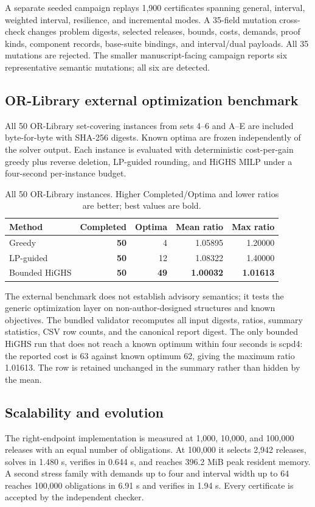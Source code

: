 \documentclass[10pt,conference]{IEEEtran}
\newcommand{\suppTableFont}{\footnotesize}
\begin{document}
A separate seeded campaign replays 1,900 certificates spanning general, interval, weighted interval, resilience, and incremental modes. A 35-field mutation cross-check changes problem digests, selected releases, bounds, costs, demands, proof kinds, component records, base-suite bindings, and interval/dual payloads. All 35 mutations are rejected. The smaller manuscript-facing campaign reports six representative semantic mutations; all six are detected.

\subsection{OR-Library external optimization benchmark}
All 50 OR-Library set-covering instances from sets 4--6 and A--E are included byte-for-byte with SHA-256 digests. Known optima are frozen independently of the solver output. Each instance is evaluated with deterministic cost-per-gain greedy plus reverse deletion, LP-guided rounding, and HiGHS MILP under a four-second per-instance budget.

\begin{table}[t]
\centering
\caption{All 50 OR-Library instances. Higher Completed/Optima and lower ratios are better; best values are bold.}
\suppTableFont
\begin{tabular}{lrrrr}
\toprule
Method & Completed & Optima & Mean ratio & Max ratio \\
\midrule
Greedy & \textbf{50} & 4 & 1.05895 & 1.20000 \\
LP-guided & \textbf{50} & 12 & 1.08322 & 1.40000 \\
Bounded HiGHS & \textbf{50} & \textbf{49} & \textbf{1.00032} & \textbf{1.01613} \\
\bottomrule
\end{tabular}
\end{table}

The external benchmark does not establish advisory semantics; it tests the generic optimization layer on non-author-designed structures and known objectives. The bundled validator recomputes all input digests, ratios, summary statistics, CSV row counts, and the canonical report digest.
The only bounded HiGHS run that does not reach a known optimum within four seconds is scpd4: the reported cost is 63 against known optimum 62, giving the maximum ratio 1.01613. The row is retained unchanged in the summary rather than hidden by the mean.

\subsection{Scalability and evolution}
The right-endpoint implementation is measured at 1,000, 10,000, and 100,000 releases with an equal number of obligations. At 100,000 it selects 2,942 releases, solves in 1.480 s, verifies in 0.644 s, and reaches 396.2 MiB peak resident memory. A second stress family with demands up to four and interval width up to 64 reaches 100,000 obligations in 6.91 s and verifies in 1.94 s. Every certificate is accepted by the independent checker.
\end{document}
